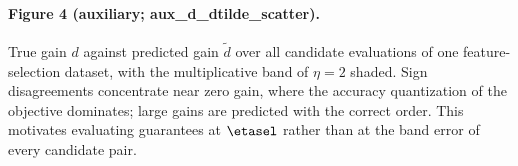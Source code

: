 \paragraph{Figure 4 (auxiliary; aux\_d\_dtilde\_scatter).}
True gain $d$ against predicted gain $\tilde d$ over all candidate
evaluations of one feature-selection dataset, with the multiplicative band
of $\eta=2$ shaded.  Sign disagreements concentrate near zero gain, where
the accuracy quantization of the objective dominates; large gains are
predicted with the correct order.  This motivates evaluating guarantees at
$\etasel$ rather than at the band error of every candidate pair.
